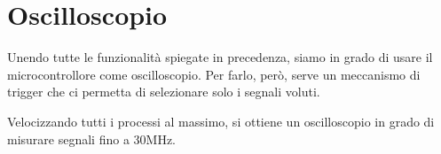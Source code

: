 
\section{Oscilloscopio}

Unendo tutte le funzionalità spiegate in precedenza, siamo in grado di usare il microcontrollore come oscilloscopio. Per farlo, però, serve un meccanismo di trigger che ci permetta di selezionare solo i segnali voluti.



Velocizzando tutti i processi al massimo, si ottiene un oscilloscopio in grado di misurare segnali fino a 30MHz.\\